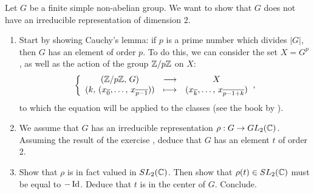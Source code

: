  
\begin{exo}
\label{exo-representation-gpe-simple}
 
 Let $ G $ be a finite simple non-abelian group. We want to show that $ G $ does not have an irreducible representation of dimension 2. \begin{enumerate}
\item {}   Start by showing Cauchy's lemma: if $ p $ is a prime number which divides $ |G| $, then $ G $ has an element of order $ p $. To do this, we can consider the set $ X = G^p $, as well as the action of the group $ \mathbb{Z}/p \mathbb{Z} $ on $ X $:
\begin{equation*}
{\left\{ \begin{array}{ccc} (\mathbb{Z}/p \mathbb{Z}, \, G) & \longrightarrow & X \\ (k, \, (x_{\overline{0}}, \ldots, \, x_{\overline{p-1}} )) & \longmapsto & (x_{\overline{k}}, \ldots, \, x_{\overline{p-1 + k}}) \end{array} \right.},
\end{equation*}
to which the equation will be applied to the classes (see the book by ).
\item We assume that $ G $ has an irreducible representation $ \rho: G \rightarrow GL_2 (\mathbb{C}) $. Assuming the result of the exercise , deduce that $ G $ has an element $ t $ of order 2.
\item Show that $ \rho $ is in fact valued in $ SL_2 (\mathbb{C}) $. Then show that $ \rho (t) \in SL_2 (\mathbb{C}) $ must be equal to $ - \operatorname{Id} $. Deduce that $ t $ is in the center of $ G $. Conclude.
\end{enumerate}
\end{exo}
 

